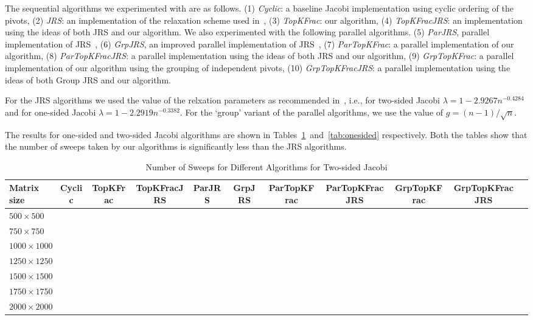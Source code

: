 \documentclass[10pt, conference, compsocconf]{IEEEtran}
\begin{document}
The sequential algorithms we experimented with are as follows. (1) \emph{Cyclic}:  a baseline Jacobi implementation using cyclic ordering of the pivots, (2) \emph{JRS}: an implementation of the relaxation scheme used in~\cite{rajasekaran2008relaxation}, (3) \emph{TopKFrac}: our algorithm, (4) \emph{TopKFracJRS}: an implementation using the ideas of both JRS and our algorithm. We also experimented with the following parallel algorithms. (5) \emph{ParJRS}, parallel implementation of JRS~\cite{rajasekaran2008relaxation}, (6) \emph{GrpJRS}, an improved parallel implementation of JRS~\cite{rajasekaran2008relaxation}, (7) \emph{ParTopKFrac}: a parallel implementation of our algorithm, (8) \emph{ParTopKFracJRS}: a parallel implementation using the ideas of both JRS and our algorithm, (9)   \emph{GrpTopKFrac}: a parallel implementation of our algorithm using the grouping of independent pivots, (10) \emph{GrpTopKFracJRS}: a parallel implementation using the ideas of both Group JRS and our algorithm.

For the JRS algorithms we used the value of the relxation parameters as recommended in~\cite{rajasekaran2008relaxation}, i.e., for two-sided Jacobi $\lambda = 1- 2.9267n^{-0.4284}$ and for one-sided Jacobi $\lambda = 1 - 2.2919 n^{-0.3382}$. For the `group' variant of the parallel algorithms, we use the value of $g = (n-1)/\sqrt{n}$. 

The results for one-sided and two-sided Jacobi algorithms are shown in Tables~\ref{tab:twosided}~and~\ref{tab:onesided} respectively. Both the tables show that the number of sweeps taken by our algorithms is significantly less than the JRS algorithms.

\begin{table}
  \centering
  \caption{Number of Sweeps for Different Algorithms for Two-sided Jacobi}
  \label{tab:twosided}
  \begin{tabular}{lcccccccccc}
    \toprule
    Matrix size & Cyclic & TopKFrac & TopKFracJRS & ParJRS & GrpJRS & ParTopKFrac & ParTopKFracJRS & GrpTopKFrac & GrpTopKFracJRS \\
    \midrule
    $500 \times 500$   &  \\
    $750 \times 750$   &  \\
    $1000 \times 1000$ &  \\
    $1250 \times 1250$ &  \\
    $1500 \times 1500$ &  \\
    $1750 \times 1750$ &  \\
    $2000 \times 2000$ &  \\
    \bottomrule
  \end{tabular}
\end{table}
\end{document}
